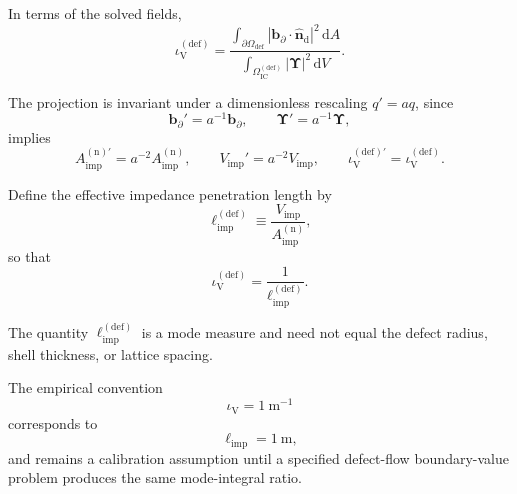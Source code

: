In terms of the solved fields,
\begin{equation}
    \iota_{\mathrm{V}}^{(\mathrm{def})}
    =
    \frac{
        \displaystyle
        \int_{\partial\Omega_{\mathrm{def}}}
        |\mathbf{b}_{\partial}\cdot\hat{\mathbf{n}}_{\mathrm{d}}|^2
        \,
        \mathrm{d}A
    }{
        \displaystyle
        \int_{\Omega_{\mathrm{IC}}^{(\mathrm{def})}}
        |\boldsymbol{\Upsilon}|^2
        \,
        \mathrm{d}V
    }.
\end{equation}

The projection is invariant under a dimensionless rescaling $q'=aq$, since
\begin{equation}
    \mathbf{b}_{\partial}'
    =
    a^{-1}\mathbf{b}_{\partial},
    \qquad
    \boldsymbol{\Upsilon}'
    =
    a^{-1}\boldsymbol{\Upsilon},
\end{equation}
implies
\begin{equation}
    A_{\mathrm{imp}}^{(\mathrm{n})\prime}
    =
    a^{-2}
    A_{\mathrm{imp}}^{(\mathrm{n})},
    \qquad
    V_{\mathrm{imp}}'
    =
    a^{-2}
    V_{\mathrm{imp}},
    \qquad
    \iota_{\mathrm{V}}^{(\mathrm{def})\prime}
    =
    \iota_{\mathrm{V}}^{(\mathrm{def})}.
\end{equation}

Define the effective impedance penetration length by
\begin{equation}
    \ell_{\mathrm{imp}}^{(\mathrm{def})}
    \equiv
    \frac{
        V_{\mathrm{imp}}
    }{
        A_{\mathrm{imp}}^{(\mathrm{n})}
    },
\end{equation}
so that
\begin{equation}
    \iota_{\mathrm{V}}^{(\mathrm{def})}
    =
    \frac{
        1
    }{
        \ell_{\mathrm{imp}}^{(\mathrm{def})}
    }.
\end{equation}

The quantity $\ell_{\mathrm{imp}}^{(\mathrm{def})}$ is a mode measure and need not equal the defect radius, shell thickness, or lattice spacing.

The empirical convention
\begin{equation}
    \iota_{\mathrm{V}}
    =
    1\ \mathrm{m}^{-1}
\end{equation}
corresponds to
\begin{equation}
    \ell_{\mathrm{imp}}
    =
    1\ \mathrm{m},
\end{equation}
and remains a calibration assumption until a specified defect-flow boundary-value problem produces the same mode-integral ratio.


